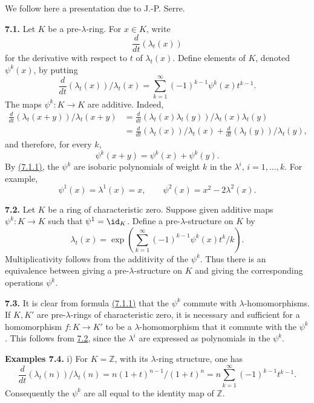 We follow here a presentation due to J.-P. Serre.

\textbf{7.1.} Let \(K\) be a pre-\(\lambda\)-ring. For \(x\in K\), write
\[
  \frac{d}{dt}(\lambda_t(x))
\]
for the derivative with respect to \(t\) of \(\lambda_t(x)\). Define elements of \(K\), denoted \(\psi^k(x)\), by putting
\begin{equation}\tag{7.1.1}
  \frac{d}{dt}(\lambda_t(x))/\lambda_t(x)
  =
  \sum_{k=1}^{\infty}(-1)^{k-1}\psi^k(x)t^{k-1}.
\end{equation}
The maps \(\psi^k:K\to K\) are additive. Indeed,
\[
\begin{aligned}
 \frac{d}{dt}(\lambda_t(x+y))/\lambda_t(x+y)
 &=
 \frac{d}{dt}(\lambda_t(x)\lambda_t(y))/\lambda_t(x)\lambda_t(y)\\
 &=
 \frac{d}{dt}(\lambda_t(x))/\lambda_t(x)
 +\frac{d}{dt}(\lambda_t(y))/\lambda_t(y),
\end{aligned}
\]
and therefore, for every \(k\),
\[
  \psi^k(x+y)=\psi^k(x)+\psi^k(y).
\]
By \hyperlink{sga6.e05.eq.7-1-1}{(7.1.1)}, the \(\psi^k\) are isobaric polynomials of weight \(k\) in the \(\lambda^i\), \(i=1,\ldots,k\). For example,
\[
  \psi^1(x)=\lambda^1(x)=x,
  \qquad
  \psi^2(x)=x^2-2\lambda^2(x).
\]

\textbf{7.2.} Let \(K\) be a ring of characteristic zero. Suppose given additive maps \(\psi^k:K\to K\) such that \(\psi^1=\id_K\). Define a pre-\(\lambda\)-structure on \(K\) by
\begin{equation}\tag{7.2.1}
  \lambda_t(x)=
  \exp\left(\sum_{k=1}^{\infty}(-1)^{k-1}\psi^k(x)t^k/k\right).
\end{equation}
Multiplicativity follows from the additivity of the \(\psi^k\). Thus there is an equivalence between giving a pre-\(\lambda\)-structure on \(K\) and giving the corresponding operations \(\psi^k\).

\textbf{7.3.} It is clear from formula \hyperlink{sga6.e05.eq.7-1-1}{(7.1.1)} that the \(\psi^k\) commute with \(\lambda\)-homomorphisms. If \(K,K'\) are pre-\(\lambda\)-rings of characteristic zero, it is necessary and sufficient for a homomorphism \(f:K\to K'\) to be a \(\lambda\)-homomorphism that it commute with the \(\psi^k\). This follows from \hyperlink{sga6.e05.para.7-2}{7.2}, since the \(\lambda^i\) are expressed as polynomials in the \(\psi^k\).

\textbf{Examples 7.4.} i) For \(K=\mathbb Z\), with its \(\lambda\)-ring structure, one has
\[
  \frac{d}{dt}(\lambda_t(n))/\lambda_t(n)
  =
  n(1+t)^{n-1}/(1+t)^n
  =
  n\sum_{k=1}^{\infty}(-1)^{k-1}t^{k-1}.
\]
Consequently the \(\psi^k\) are all equal to the identity map of \(\mathbb Z\).

